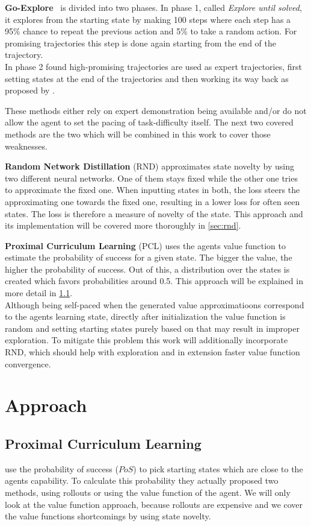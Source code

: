 \documentclass{article}
\begin{document}
\textbf{Go-Explore}~\citep{go_explore} is divided into two phases. In phase 1, called \textit{Explore until solved}, it explores from the starting state by making 100 steps where each step has a 95\% chance to repeat the previous action and 5\% to take a random action. For promising trajectories this step is done again starting from the end of the trajectory.\\
In phase 2 found high-promising trajectories are used as expert trajectories, first setting states at the end of the trajectories and then working its way back as proposed by \cite{montezuma_demonstration}.

These methods either rely on expert demonstration being available and/or do not allow the agent to set the pacing of task-difficulty itself. The next two covered methods are the two which will be combined in this work to cover those weaknesses.

\textbf{Random Network Distillation} (RND) approximates state novelty by using two different neural networks. One of them stays fixed while the other one tries to approximate the fixed one. When inputting states in both, the loss steers the approximating one towards the fixed one, resulting in a lower loss for often seen states. The loss is therefore a measure of novelty of the state. This approach and its implementation will be covered more thoroughly in \cref{sec:rnd}.

\textbf{Proximal Curriculum Learning} (PCL) uses the agents value function to estimate the probability of success for a given state. The bigger the value, the higher the probability of success. Out of this, a distribution over the states is created which favors probabilities around 0.5. This approach will be explained in more detail in \cref{sec:prox_detail}. \\
Although being self-paced when the generated value approximatioons correspond to the agents learning state, directly after initialization the value function is random and setting starting states purely based on that may result in improper exploration. To mitigate this problem this work will additionally incorporate RND, which should help with exploration and in extension faster value function convergence.


\section{Approach}
\label{sec:Approach}

\subsection{Proximal Curriculum Learning}
\label{sec:prox_detail}
\cite{prox_curr} use the probability of success ($PoS$) to pick starting states which are close to the agents capability.
To calculate this probability they actually proposed two methods, using rollouts or using the value function of the agent. We will only look at the value function approach, because rollouts are expensive and we cover the value functions shortcomings by using state novelty.
\end{document}
